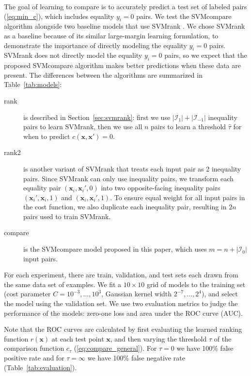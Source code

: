 \documentclass[twoside,11pt]{article}
\begin{document}
The goal of learning to compare is to accurately predict a test set of
labeled pairs (\ref{eq:min_c}), which includes equality $y_i=0$
pairs. We test the SVMcompare algorithm alongside two baseline models
that use SVMrank \citep{ranksvm}. We chose SVMrank as a baseline
because of its similar large-margin learning formulation, to
demonstrate the importance of directly modeling the equality $y_i=0$
pairs. SVMrank does not directly model the equality $y_i=0$ pairs, so
we expect that the proposed SVMcompare algorithm makes better
predictions when these data are present. The differences between the
algorithms are summarized in Table~\ref{tab:models}:

\begin{description}
\item[rank] is described in Section~\ref{sec:svmrank}: first we use
  $|\mathcal I_1|+|\mathcal I_{-1}|$ inequality pairs to learn
  SVMrank, then we use all $n$ pairs to learn a threshold $\hat \tau$
  for when to predict $c(\mathbf x,\mathbf x')=0$.
\item[rank2] is another variant of SVMrank that treats each input pair
  as 2 inequality pairs. Since SVMrank can only use inequality pairs,
  we transform each equality pair $(\mathbf x_i,\mathbf x_i',0)$ into two
  opposite-facing inequality pairs $(\mathbf x_i',\mathbf x_i,1)$ and
  $(\mathbf x_i,\mathbf x_i',1)$. 
  To ensure equal weight for all input pairs in the
  cost function, we also duplicate each inequality pair, resulting in
  $2n$ pairs used to train SVMrank.
\item[compare] is the SVMcompare model proposed in this paper, which
  uses $m=n+|\mathcal I_0|$ input pairs.
\end{description}

For each experiment, there are train, validation, and test sets each
drawn from the same data set of examples. We fit a $10\times 10$ grid of
models to the training set (cost parameter $C=10^{-3},\dots,10^3$,
Gaussian kernel width $2^{-7},\dots,2^4$), and select the model using
the validation set. We use two evaluation metrics to judge the
performance of the models: zero-one loss and area under the ROC curve
(AUC).

Note that the ROC curves are calculated by first evaluating the
learned ranking function $r(\mathbf x)$ at each test point $\mathbf
x$, and then varying the threshold $\tau$ of the comparison function
$c_\tau$ (\ref{eq:compare_general}). For $\tau=0$ we have 100\% false
positive rate and for $\tau=\infty$ we have 100\% false negative rate
(Table~\ref{tab:evaluation}).
\end{document}
